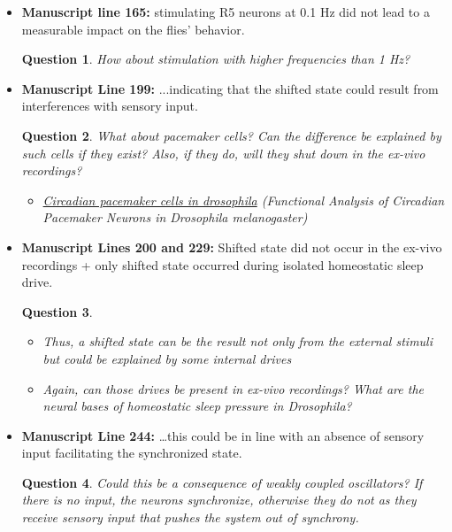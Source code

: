 \documentclass[11pt]{article}
\theoremstyle{questionstyle}
\newtheorem{question}{Question}
\theoremstyle{defaultstyle}
\begin{document}
\begin{itemize}
    \item \textbf{Manuscript line 165:} stimulating R5 neurons at 0.1 Hz did not lead to a measurable impact on the flies’ behavior.
    \begin{question}
        How about stimulation with higher frequencies than 1 Hz?
    \end{question}

    \item \textbf{Manuscript Line 199:} ...indicating that the shifted state could result from interferences with sensory input.
    \begin{question}
        What about pacemaker cells? Can the difference be explained by such cells if they exist? Also, if they do, will they shut down in the ex-vivo recordings?
        \begin{itemize}
            \item \href{https://pmc.ncbi.nlm.nih.gov/articles/PMC6793667/#:~:text=of%20clock%20neurons-,D.,DN3%20cells)%20(Fig.}{Circadian pacemaker cells in drosophila} (Functional Analysis of Circadian Pacemaker Neurons in Drosophila melanogaster)
        \end{itemize}
    \end{question}

    \item \textbf{Manuscript Lines 200 and 229:} Shifted state did not occur in the ex-vivo recordings + only shifted state occurred during isolated homeostatic sleep drive.
    \begin{question}
        \hphantom\newline
        \begin{itemize}
            \item Thus, a shifted state can be the result not only from the external stimuli but could be explained by some internal drives 
        
            \item Again, can those drives be present in ex-vivo recordings? What are the neural bases of homeostatic sleep pressure in Drosophila?
        \end{itemize}
    \end{question}

    \item \textbf{Manuscript Line 244:} …this could be in line with an absence of sensory input facilitating the synchronized state.
    \begin{question}
        Could this be a consequence of weakly coupled oscillators? If there is no input, the neurons synchronize, otherwise they do not as they receive sensory input that pushes the system out of synchrony.
    \end{question}



\end{itemize}
\end{document}
